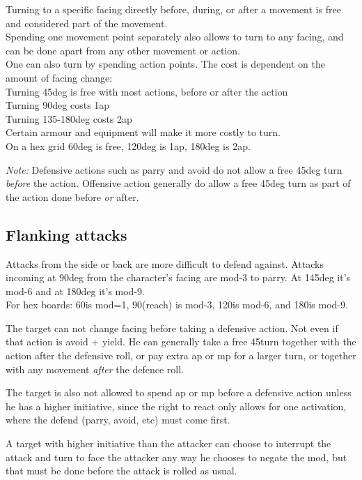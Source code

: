Turning to a specific facing directly before, during, or after a movement is free and considered part of the movement. \\
Spending one movement point separately also allows to turn to any facing, and can be done apart from any other movement or action. \\
One can also turn by spending action points. The cost is dependent on the amount of facing change: \\
Turning 45deg is free with most actions, before or after the action \\
Turning 90deg costs 1ap \\
Turning 135-180deg costs 2ap \\
Certain armour and equipment will make it more costly to turn.\\
On a hex grid 60deg is free, 120deg is 1ap, 180deg is 2ap.

\emph{Note:} Defensive actions such as parry and avoid do not allow a free 45deg turn \emph{before} the action. Offensive action generally do allow a free 45deg turn as part of the action done before \emph{or} after.


\subsection*{Flanking attacks}
Attacks from the side or back are more difficult to defend against. Attacks incoming at 90deg from the character's facing are mod-3 to parry. At 145deg it's mod-6 and at 180deg it's mod-9.\\
For hex boards: 60\degrees is mod=1, 90\degrees (reach) is mod-3, 120\degrees is mod-6, and 180\degrees is mod-9.

The target can not change facing before taking a defensive action. Not even if that action is avoid + yield. He can generally take a free 45\degrees turn together with the action after the defensive roll, or pay extra ap or mp for a larger turn, or together with any movement \emph{after} the defence roll.

The target is also not allowed to spend ap or mp before a defensive action unless he has a higher initiative, since the right to react only allows for one activation, where the defend (parry, avoid, etc) must come first.

A target with higher initiative than the attacker can choose to interrupt the attack and turn to face the attacker any way he chooses to negate the mod, but that must be done before the attack is rolled as usual.


